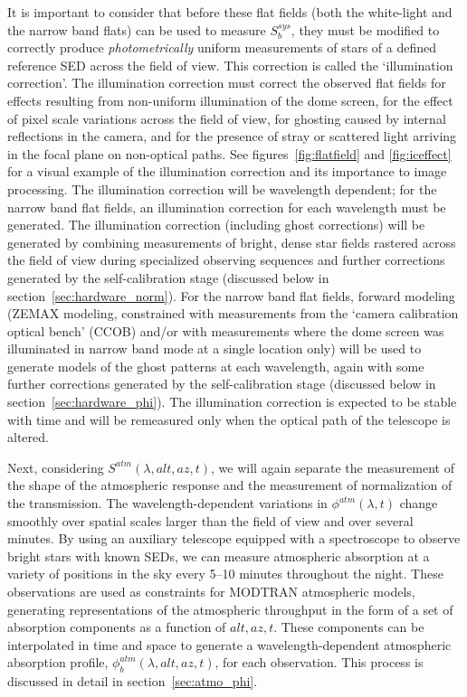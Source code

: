 \documentclass[12pt,preprint]{aastex}
\begin{document}
It is important to consider that before these flat fields (both the white-light
and the narrow band flats) can be used to measure $S_b^{sys}$, they
must be modified to correctly produce {\it photometrically} uniform
measurements of stars of a defined reference SED across the field of
view. This correction is called the `illumination correction'.  The
illumination correction must correct the observed flat fields for
effects resulting from non-uniform illumination of the dome screen,
for the effect of pixel scale variations across the field of view, for
ghosting caused by internal reflections in the camera, and for the
presence of stray or scattered light arriving in the focal plane on
non-optical paths. See figures~\ref{fig:flatfield} and
\ref{fig:iceffect} for a visual example of the illumination correction
and its importance to image processing. The illumination correction
will be wavelength dependent; for the narrow band flat fields, an
illumination correction for each wavelength must be generated.  The
illumination correction (including ghost corrections) will be
generated by combining measurements of bright, dense star fields
rastered across the field of view during specialized observing
sequences and further corrections generated by the self-calibration
stage (discussed below in section~\ref{sec:hardware_norm}). For the
narrow band flat fields, forward modeling (ZEMAX modeling, constrained
with measurements from the `camera calibration optical bench' (CCOB)
and/or with measurements where the dome screen was illuminated in
narrow band mode at a single location only) will be used to generate
models of the ghost patterns at each wavelength, again with some
further corrections generated by the self-calibration stage (discussed
below in section~\ref{sec:hardware_phi}).  The illumination correction
is expected to be stable with time and will be remeasured only when
the optical path of the telescope is altered. 

Next, considering $S^{atm}(\lambda,alt,az,t)$, we will again separate
the measurement of the shape of the atmospheric response and the
measurement of normalization of the transmission.  The
wavelength-dependent variations in $\phi^{atm}(\lambda,t)$ change
smoothly over spatial scales larger than the field of view and over
several minutes.  By using an auxiliary telescope equipped with a
spectroscope to observe bright stars with known SEDs, we can measure
atmospheric absorption at a variety of positions in the sky every
5--10 minutes throughout the night. These observations are used as
constraints for MODTRAN atmospheric models, generating representations
of the atmospheric throughput in the form of a set of absorption
components as a function of $alt,az,t$. These components can be
interpolated in time and space to generate a wavelength-dependent
atmospheric absorption profile, $\phi_b^{atm}(\lambda,alt,az,t)$, for
each observation. This process is discussed in detail in
section~\ref{sec:atmo_phi}.  
\end{document}
